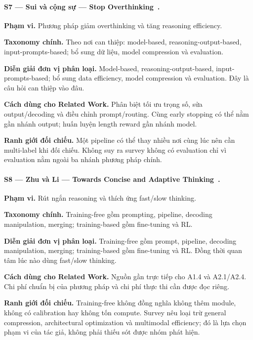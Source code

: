 \paragraph{S7 — Sui và cộng sự — Stop Overthinking~\cite{survey_sui2025overthinking}.}
\noindent\textbf{Phạm vi.} Phương pháp giảm overthinking và tăng reasoning efficiency.\par
\noindent\textbf{Taxonomy chính.} Theo nơi can thiệp: model-based, reasoning-output-based, input-prompts-based; bổ sung dữ liệu, model compression và evaluation.\par
\noindent\textbf{Diễn giải đơn vị phân loại.} Model-based, reasoning-output-based, input-prompts-based; bổ sung data efficiency, model compression và evaluation. Đây là câu hỏi can thiệp vào đâu.\par
\noindent\textbf{Cách dùng cho Related Work.} Phân biệt tối ưu trọng số, sửa output/decoding và điều chỉnh prompt/routing. Cùng early stopping có thể nằm gần nhánh output; huấn luyện length reward gần nhánh model.\par
\noindent\textbf{Ranh giới đối chiếu.} Một pipeline có thể thay nhiều nơi cùng lúc nên cần multi-label khi đối chiếu. Không suy ra survey không có evaluation chỉ vì evaluation nằm ngoài ba nhánh phương pháp chính.\par
{}

\paragraph{S8 — Zhu và Li — Towards Concise and Adaptive Thinking~\cite{survey_zhu2025adaptive}.}
\noindent\textbf{Phạm vi.} Rút ngắn reasoning và thích ứng fast/slow thinking.\par
\noindent\textbf{Taxonomy chính.} Training-free gồm prompting, pipeline, decoding manipulation, merging; training-based gồm fine-tuning và RL.\par
\noindent\textbf{Diễn giải đơn vị phân loại.} Training-free gồm prompt, pipeline, decoding manipulation, merging; training-based gồm fine-tuning và RL. Đồng thời quan tâm lúc nào dùng fast/slow thinking.\par
\noindent\textbf{Cách dùng cho Related Work.} Nguồn gần trực tiếp cho A1.4 và A2.1/A2.4. Chi phí chuẩn bị của phương pháp và chi phí thực thi cần được đọc riêng.\par
\noindent\textbf{Ranh giới đối chiếu.} Training-free không đồng nghĩa không thêm module, không có calibration hay không tốn compute. Survey nêu loại trừ general compression, architectural optimization và multimodal efficiency; đó là lựa chọn phạm vi của tác giả, không phải thiếu sót được nhóm phát hiện.\par
{}


